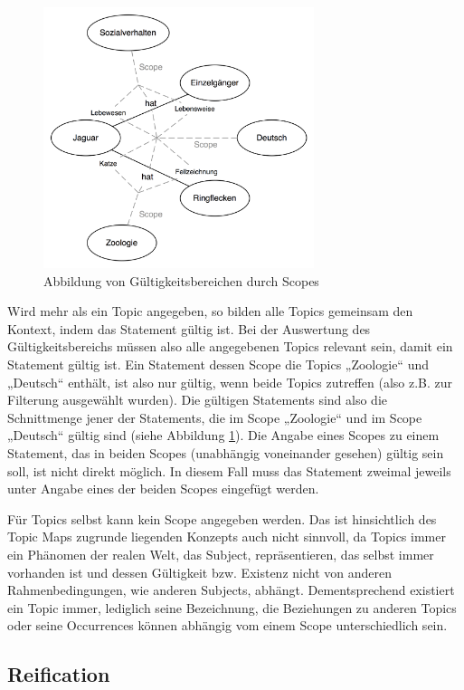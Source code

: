 \begin{figure}[htbp]
	\centering
		\includegraphics[height=3in]{img/Persistenz/Scope.png}
	\caption{Abbildung von Gültigkeitsbereichen durch Scopes}
	\label{fig:img_Persistenz_Scope}
\end{figure}


Wird mehr als ein Topic angegeben, so bilden alle Topics gemeinsam den Kontext, indem das Statement gültig ist. Bei der Auswertung des Gültigkeitsbereichs müssen also alle angegebenen Topics relevant sein, damit ein Statement gültig ist. Ein Statement dessen Scope die Topics „Zoologie“ und „Deutsch“ enthält, ist also nur gültig, wenn beide Topics zutreffen (also z.B. zur Filterung ausgewählt wurden). Die gültigen Statements sind also die Schnittmenge jener der Statements, die im Scope „Zoologie“ und im Scope „Deutsch“ gültig sind (siehe Abbildung \ref{fig:img_Persistenz_Scope}). Die Angabe eines Scopes zu einem Statement, das in beiden Scopes (unabhängig voneinander gesehen) gültig sein soll, ist nicht direkt möglich. In diesem Fall muss das Statement zweimal jeweils unter Angabe eines der beiden Scopes eingefügt werden.

Für Topics selbst kann kein Scope angegeben werden. Das ist hinsichtlich des Topic Maps zugrunde liegenden Konzepts auch nicht sinnvoll, da Topics immer ein Phänomen der realen Welt, das Subject, repräsentieren, das selbst immer vorhanden ist und dessen Gültigkeit bzw. Existenz nicht von anderen Rahmenbedingungen, wie anderen Subjects, abhängt. Dementsprechend existiert ein Topic immer, lediglich seine Bezeichnung, die Beziehungen zu anderen Topics oder seine Occurrences können abhängig vom einem Scope unterschiedlich sein.

\subsection{Reification} %
\label{sub:reification}

